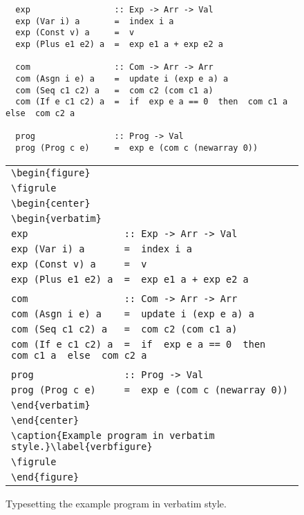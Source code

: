 \documentclass{jfp}
\begin{document}
\begin{figure}
\figrule
\begin{verbatim}
  exp                 :: Exp -> Arr -> Val
  exp (Var i) a       =  index i a
  exp (Const v) a     =  v
  exp (Plus e1 e2) a  =  exp e1 a + exp e2 a

  com                 :: Com -> Arr -> Arr
  com (Asgn i e) a    =  update i (exp e a) a
  com (Seq c1 c2) a   =  com c2 (com c1 a)
  com (If e c1 c2) a  =  if  exp e a == 0  then  com c1 a  else  com c2 a

  prog                :: Prog -> Val
  prog (Prog c e)     =  exp e (com c (newarray 0))
\end{verbatim}
\caption{Example program in verbatim style.}\label{verbfigure}
\figrule
\begin{tabular}{l}
\verb|\begin{figure}| \\
\verb|\figrule| \\
\verb|\begin{center}| \\
\verb|\begin{verbatim}| \\
\verb|exp                 :: Exp -> Arr -> Val| \\
\verb|exp (Var i) a       =  index i a| \\
\verb|exp (Const v) a     =  v| \\
\verb|exp (Plus e1 e2) a  =  exp e1 a + exp e2 a| \\
\\
\verb|com                 :: Com -> Arr -> Arr| \\
\verb|com (Asgn i e) a    =  update i (exp e a) a| \\
\verb|com (Seq c1 c2) a   =  com c2 (com c1 a)| \\
\verb|com (If e c1 c2) a  =  if  exp e a == 0  then  com c1 a  else  com c2 a| \\
\\
\verb|prog                :: Prog -> Val| \\
\verb|prog (Prog c e)     =  exp e (com c (newarray 0))| \\
\verb|\end{verbatim}| \\
\verb|\end{center}| \\
\verb|\caption{Example program in verbatim style.}\label{verbfigure}| \\
\verb|\figrule| \\
\verb|\end{figure}|
\end{tabular}
\caption{Typesetting the example program in verbatim style.}\label{verbtypeset}
\figrule
\end{figure}
\end{document}
